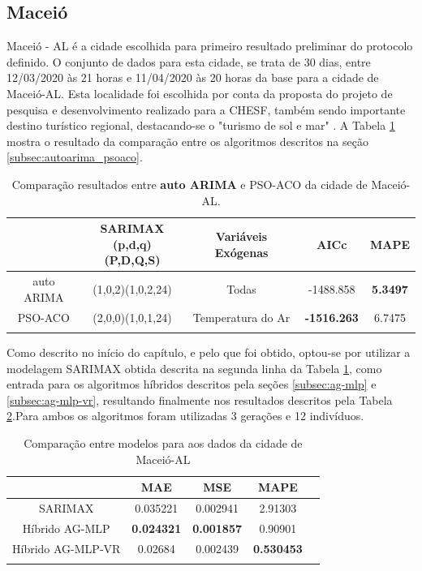 \subsection{Maceió}

Maceió - AL é a cidade escolhida para primeiro resultado preliminar do protocolo definido. O conjunto de dados para esta cidade, se trata de 30 dias, entre 12/03/2020 às 21 horas e 11/04/2020 às 20 horas da base para a cidade de Maceió-AL. Esta localidade foi escolhida por conta da proposta do projeto de pesquisa e desenvolvimento realizado para a CHESF, também sendo importante destino turístico regional, destacando-se o "turismo de sol e mar" \cite{vasconcelos2019turismo}. A Tabela \ref{tab:cap4_comp_maceio_autoarima_psoaco} mostra o resultado da comparação entre os algoritmos descritos na seção \ref{subsec:autoarima_psoaco}. 

\begin{table}[htbp]
\caption{Comparação resultados entre \textbf{auto ARIMA} e PSO-ACO da cidade de Maceió-AL.}
\begin{center}
\begin{tabular}{ccccc}
                    & \Longstack{SARIMAX \\ (p,d,q)(P,D,Q,S)} & Variáveis Exógenas & AICc & MAPE  \\\hline
auto ARIMA & (1,0,2)(1,0,2,24) & Todas & -1488.858 & \textbf{5.3497} \\\hline
PSO-ACO             & (2,0,0)(1,0,1,24) & Temperatura do Ar & \textbf{-1516.263} & 6.7475 \\\hline
\label{tab:cap4_comp_maceio_autoarima_psoaco}
\end{tabular}
\end{center}
\end{table}

Como descrito no início do capítulo, e pelo que foi obtido, optou-se por utilizar a modelagem SARIMAX obtida descrita na segunda linha da Tabela \ref{tab:cap4_comp_maceio_autoarima_psoaco}, como entrada para os algoritmos híbridos descritos pela seções \ref{subsec:ag-mlp} e \ref{subsec:ag-mlp-vr}, resultando finalmente nos resultados descritos pela Tabela \ref{tab:cap4_comp_maceio_agmlp_agmlpvr}.Para ambos os algoritmos foram utilizadas 3 gerações e 12 indivíduos.

\begin{table}[htbp]
\caption{Comparação entre modelos para aos dados da cidade de Maceió-AL}
\begin{center}
\begin{tabular}{ccccc}
                & MAE & MSE & MAPE \\\hline
SARIMAX         & 0.035221 & 0.002941 & 2.91303 \\\hline
Híbrido AG-MLP  & \textbf{0.024321} & \textbf{0.001857} & 0.90901 \\\hline
Híbrido AG-MLP-VR & 0.02684 & 0.002439 & \textbf{0.530453} \\\hline
\label{tab:cap4_comp_maceio_agmlp_agmlpvr}
\end{tabular}
\end{center}
\end{table}

